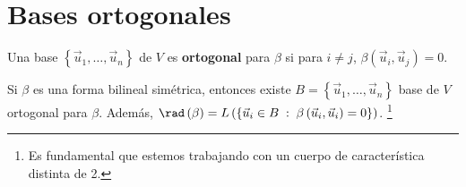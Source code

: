 \section{Bases ortogonales}
\begin{fdefinition}[]
	\normalfont Una base $\displaystyle \left\{ \vec{u}_{1}, \ldots, \vec{u}_{n}\right\}  $ de $\displaystyle V $ es \textbf{ortogonal} para $\displaystyle \beta  $ si para $\displaystyle i \neq j $, $\displaystyle \beta\left(\vec{u}_{i}, \vec{u}_{j}\right) = 0 $.
\end{fdefinition}
\begin{ftheorem}[]
	\normalfont Si $\displaystyle \beta  $ es una forma bilineal simétrica, entonces existe $\displaystyle B =\left\{ \vec{u}_{1}, \ldots, \vec{u}_{n}\right\}  $ base de $\displaystyle V $ ortogonal para $\displaystyle \beta  $. Además, $\displaystyle \rad\left(\beta \right) = L\left( \left\{ \vec{u}_{i} \in B \; : \; \beta\left(\vec{u}_{i}, \vec{u}_{i}\right)=0\right\} \right) $. \footnote{Es fundamental que estemos trabajando con un cuerpo de característica distinta de 2.} 
\end{ftheorem}
